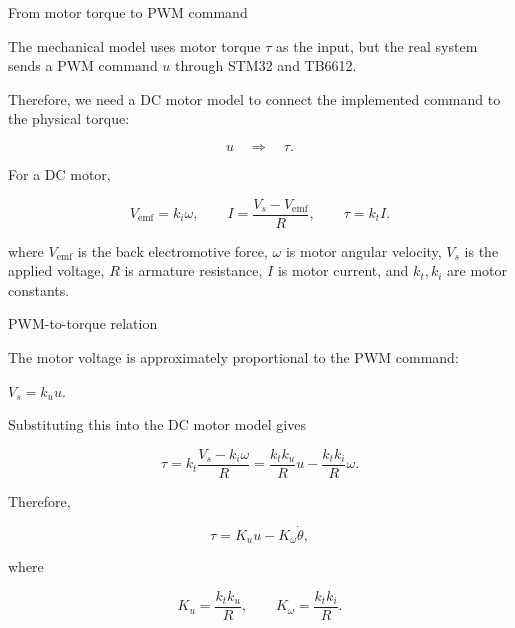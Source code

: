 \documentclass[aspectratio=169]{beamer}
\begin{document}
\begin{frame}{From motor torque to PWM command}

The mechanical model uses motor torque $\tau$ as the input, but the real system sends a PWM command $u$ through STM32 and TB6612.

\vspace{0.2cm}

Therefore, we need a DC motor model to connect the implemented command to the physical torque:

\[
u \quad \Longrightarrow \quad \tau .
\]

\vspace{0.2cm}

For a DC motor,

\[
V_{\mathrm{emf}}=k_i\omega,
\qquad
I=\frac{V_s-V_{\mathrm{emf}}}{R},
\qquad
\tau=k_t I .
\]

\vspace{0.2cm}

where $V_{\mathrm{emf}}$ is the back electromotive force, $\omega$ is motor angular velocity, $V_s$ is the applied voltage, $R$ is armature resistance, $I$ is motor current, and $k_t,k_i$ are motor constants.

\end{frame}

\begin{frame}{PWM-to-torque relation}

The motor voltage is approximately proportional to the PWM command:

$
V_s = k_u u .
$



Substituting this into the DC motor model gives

\[
\tau
=
k_t\frac{V_s-k_i\omega}{R}
=
\frac{k_t k_u}{R}u
-
\frac{k_t k_i}{R}\omega .
\]



Therefore,

\[
\tau
=
K_u u
-
K_\omega \dot{\theta},
\]

where

\[
K_u=\frac{k_t k_u}{R},
\qquad
K_\omega=\frac{k_t k_i}{R}.
\]




\end{frame}
\end{document}
